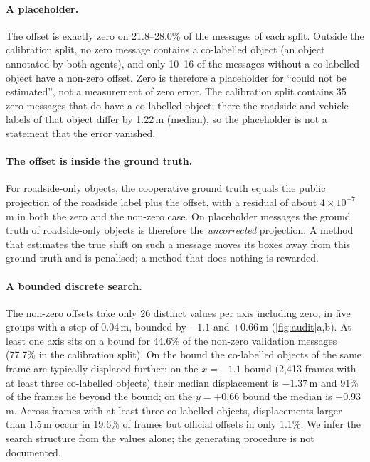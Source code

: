 \paragraph{A placeholder.}
The offset is exactly zero on 21.8--28.0\% of the messages of each split.
Outside the calibration split, no zero message contains a co-labelled object (an object annotated by both agents), and only 10--16 of the messages without a co-labelled object have a non-zero offset.
Zero is therefore a placeholder for ``could not be estimated'', not a measurement of zero error.
The calibration split contains 35 zero messages that do have a co-labelled object; there the roadside and vehicle labels of that object differ by 1.22\,m (median), so the placeholder is not a statement that the error vanished.

\paragraph{The offset is inside the ground truth.}
For roadside-only objects, the cooperative ground truth equals the public projection of the roadside label plus the offset, with a residual of about $4\times10^{-7}$\,m in both the zero and the non-zero case.
On placeholder messages the ground truth of roadside-only objects is therefore the \emph{uncorrected} projection.
A method that estimates the true shift on such a message moves its boxes away from this ground truth and is penalised; a method that does nothing is rewarded.

\paragraph{A bounded discrete search.}
The non-zero offsets take only 26 distinct values per axis including zero, in five groups with a step of 0.04\,m, bounded by $-1.1$ and $+0.66$\,m (\cref{fig:audit}a,b).
At least one axis sits on a bound for 44.6\% of the non-zero validation messages (77.7\% in the calibration split).
On the bound the co-labelled objects of the same frame are typically displaced further: on the $x=-1.1$ bound (2,413 frames with at least three co-labelled objects) their median displacement is $-1.37$\,m and 91\% of the frames lie beyond the bound; on the $y=+0.66$ bound the median is $+0.93$\,m.
Across frames with at least three co-labelled objects, displacements larger than 1.5\,m occur in 19.6\% of frames but official offsets in only 1.1\%.
We infer the search structure from the values alone; the generating procedure is not documented.

